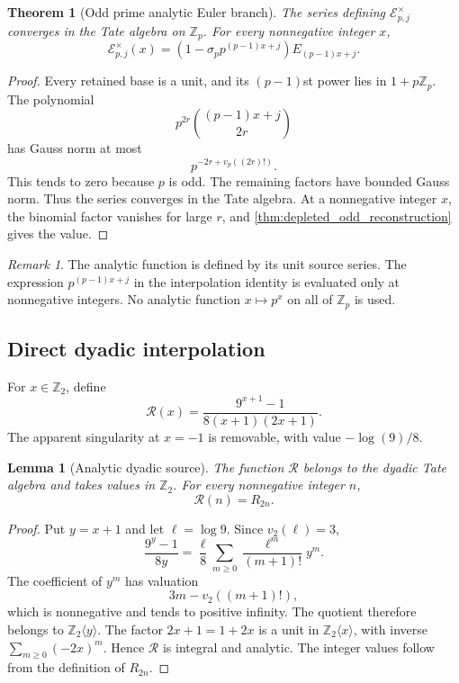 \documentclass{aomart}
\newtheorem{theorem}{Theorem}[section]
\newtheorem{lemma}[lemma]{Lemma}
\theoremstyle{definition}
\theoremstyle{remark}
\newtheorem{remark}[remark]{Remark}
\newcommand{\Zp}{\mathbb Z_p}
\newcommand{\vp}{v_p}
\newcommand{\vTwo}{v_2}
\begin{document}
\begin{theorem}[Odd prime analytic Euler branch]\label{thm:odd_analytic_branch}
The series defining \(\mathscr E_{p,j}^\times\) converges in the Tate algebra on \(\Zp\). For every nonnegative integer \(x\),
\[
\boxed{
\mathscr E_{p,j}^\times(x)
=
\left(1-\sigma_pp^{(p-1)x+j}\right)
E_{(p-1)x+j}.
}
\]
\end{theorem}

\begin{proof}
Every retained base is a unit, and its \((p-1)\)st power lies in \(1+p\Zp\). The polynomial
\[
p^{2r}\binom{(p-1)x+j}{2r}
\]
has Gauss norm at most
\[
p^{-2r+\vp((2r)!)}.
\]
This tends to zero because \(p\) is odd. The remaining factors have bounded Gauss norm. Thus the series converges in the Tate algebra. At a nonnegative integer \(x\), the binomial factor vanishes for large \(r\), and \cref{thm:depleted_odd_reconstruction} gives the value.
\end{proof}

\begin{remark}\label{rem:depleted_factor_boundary}
The analytic function is defined by its unit source series. The expression \(p^{(p-1)x+j}\) in the interpolation identity is evaluated only at nonnegative integers. No analytic function \(x\mapsto p^x\) on all of \(\Zp\) is used.
\end{remark}

\subsection{Direct dyadic interpolation}

For \(x\in\mathbb Z_2\), define
\[
\boxed{
\mathscr R(x)
=
\frac{9^{x+1}-1}{8(x+1)(2x+1)}.

}
\]
The apparent singularity at \(x=-1\) is removable, with value \(-\log(9)/8\).

\begin{lemma}[Analytic dyadic source]\label{lem:analytic_dyadic_source}
The function \(\mathscr R\) belongs to the dyadic Tate algebra and takes values in \(\mathbb Z_2\). For every nonnegative integer \(n\),
\[
\boxed{\mathscr R(n)=R_{2n}.}
\]
\end{lemma}

\begin{proof}
Put \(y=x+1\) and let \(\ell=\log 9\). Since \(\vTwo(\ell)=3\),
\[
\frac{9^y-1}{8y}
=
\frac{\ell}{8}
\sum_{m\geq0}
\frac{\ell^m}{(m+1)!}y^m.
\]
The coefficient of \(y^m\) has valuation
\[
3m-\vTwo((m+1)!),
\]
which is nonnegative and tends to positive infinity. The quotient therefore belongs to \(\mathbb Z_2\langle y\rangle\). The factor \(2x+1=1+2x\) is a unit in \(\mathbb Z_2\langle x\rangle\), with inverse \(\sum_{m\geq0}(-2x)^m\). Hence \(\mathscr R\) is integral and analytic. The integer values follow from the definition of \(R_{2n}\).
\end{proof}
\end{document}
